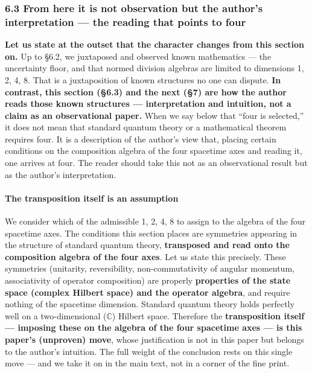\documentclass[
]{article}
\begin{document}
\subsubsection{6.3 From here it is not observation but the author's
interpretation --- the reading that points to
four}\label{from-here-it-is-not-observation-but-the-authors-interpretation-the-reading-that-points-to-four}

\textbf{Let us state at the outset that the character changes from this
section on.} Up to §6.2, we juxtaposed and observed known mathematics
--- the uncertainty floor, and that normed division algebras are limited
to dimensions 1, 2, 4, 8. That is a juxtaposition of known structures no
one can dispute. \textbf{In contrast, this section (§6.3) and the next
(§7) are how the author reads those known structures --- interpretation
and intuition, not a claim as an observational paper.} When we say below
that ``four is selected,'' it does not mean that standard quantum theory
or a mathematical theorem requires four. It is a description of the
author's view that, placing certain conditions on the composition
algebra of the four spacetime axes and reading it, one arrives at four.
The reader should take this not as an observational result but as the
author's interpretation.

\paragraph{The transposition itself is an
assumption}\label{the-transposition-itself-is-an-assumption}

We consider which of the admissible 1, 2, 4, 8 to assign to the algebra
of the four spacetime axes. The conditions this section places are
symmetries appearing in the structure of standard quantum theory,
\textbf{transposed and read onto the composition algebra of the four
axes}. Let us state this precisely. These symmetries (unitarity,
reversibility, non-commutativity of angular momentum, associativity of
operator composition) are properly \textbf{properties of the state space
(complex Hilbert space) and the operator algebra}, and require nothing
of the spacetime dimension. Standard quantum theory holds perfectly well
on a two-dimensional (\(\mathbb{C}\)) Hilbert space. Therefore the
\textbf{transposition itself --- imposing these on the algebra of the
four spacetime axes --- is this paper's (unproven) move}, whose
justification is not in this paper but belongs to the author's
intuition. The full weight of the conclusion rests on this single move
--- and we take it on in the main text, not in a corner of the fine
print.
\end{document}
